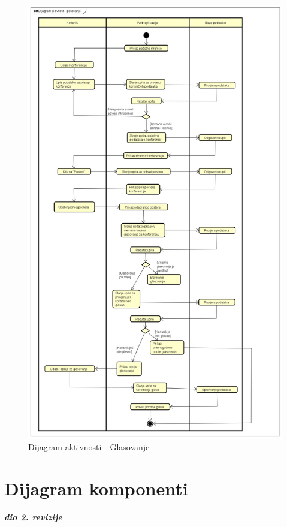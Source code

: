 			 \begin{figure}
			 	\includegraphics[width=\linewidth]{Slike/ActivityDiagram}
			 	\caption{Dijagram aktivnosti - Glasovanje}
			 \end{figure}
			
			\eject
		\section{Dijagram komponenti}
		
			\textbf{\textit{dio 2. revizije}}\\
		
